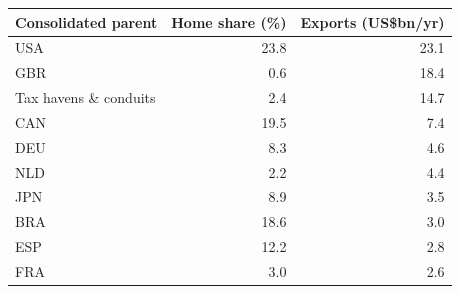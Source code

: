 \begin{tabular}{lrr}
\toprule
Consolidated parent & Home share (\%) & Exports (US\$bn/yr) \\
\midrule
USA & 23.8 & 23.1 \\
GBR & 0.6 & 18.4 \\
Tax havens \& conduits & 2.4 & 14.7 \\
CAN & 19.5 & 7.4 \\
DEU & 8.3 & 4.6 \\
NLD & 2.2 & 4.4 \\
JPN & 8.9 & 3.5 \\
BRA & 18.6 & 3.0 \\
ESP & 12.2 & 2.8 \\
FRA & 3.0 & 2.6 \\
\bottomrule
\end{tabular}
